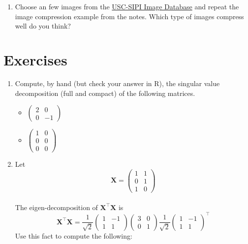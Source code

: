 \documentclass[]{book}
\providecommand{\tightlist}{%
  \setlength{\itemsep}{0pt}\setlength{\parskip}{0pt}}
\theoremstyle{definition}
\theoremstyle{definition}
\theoremstyle{definition}
\theoremstyle{remark}
\begin{document}
\begin{enumerate}
\def\labelenumi{\arabic{enumi}.}
\setcounter{enumi}{2}
\tightlist
\item
  Choose an few images from the \href{http://sipi.usc.edu/database/}{USC-SIPI Image Database} and repeat the image compression example from the notes. Which type of images compress well do you think?
\end{enumerate}

\hypertarget{exercises-ch3}{%
\section{Exercises}\label{exercises-ch3}}

\begin{enumerate}
\def\labelenumi{\arabic{enumi}.}
\tightlist
\item
  Compute, by hand (but check your answer in R), the singular value decomposition (full and compact) of the following matrices.

  \begin{itemize}
  \tightlist
  \item
    \(\left(\begin{array}{cc}2&0\\0&-1\end{array} \right)\)
  \item
    \(\left(\begin{array}{cc}1&0\\0&0\\0&0\end{array} \right)\)
  \end{itemize}
\item
  Let \[\boldsymbol X=\left(\begin{array}{cc}1&1\\0&1\\1&0\end{array}
  \right)\]\\
  The eigen-decomposition of \(\boldsymbol X^\top \boldsymbol X\) is
  \[\boldsymbol X^\top \boldsymbol X=\frac{1}{\sqrt{2}}\left(\begin{array}{cc}1&-1\\1&1\end{array}
  \right) \left(\begin{array}{cc}3&0\\0&1\end{array}
  \right)\frac{1}{\sqrt{2}}\left(\begin{array}{cc}1&-1\\1&1\end{array}
  \right)^\top \]
  Use this fact to compute the following:


\end{enumerate}
\end{document}
